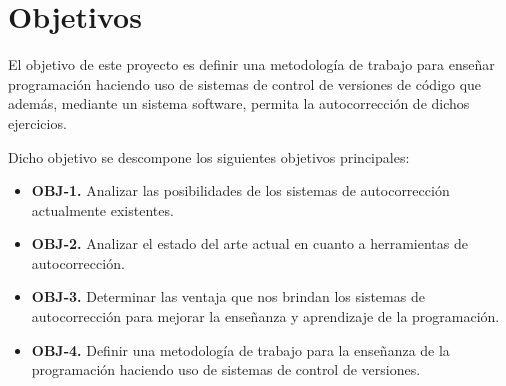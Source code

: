 \chapter{Objetivos}

El objetivo de este proyecto es definir una metodología de trabajo para enseñar programación haciendo uso de sistemas de control de versiones de código que además, mediante un sistema software, permita la autocorrección de dichos ejercicios.







\bigskip
Dicho objetivo se descompone los siguientes objetivos principales:

\begin{itemize}
  \item \textbf{OBJ-1.} Analizar las posibilidades de los sistemas de autocorrección actualmente existentes.
  \item \textbf{OBJ-2.} Analizar el estado del arte actual en cuanto a herramientas de autocorrección.
  \item \textbf{OBJ-3.} Determinar las ventaja que nos brindan los sistemas de autocorrección para mejorar la enseñanza y aprendizaje de la programación.
  \item \textbf{OBJ-4.} Definir una metodología de trabajo para la enseñanza de la programación haciendo uso de sistemas de control de versiones.

\end{itemize}

